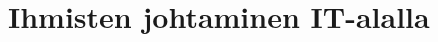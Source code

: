 \documentclass[a4paper]{article}
\begin{document}




\section{Ihmisten johtaminen IT-alalla}





\citep{grosjean2010}
\citep{appelo2012}
\citep{rsaanimate}
\citep{adkins2010}
\citep{augustine2005}
\citep{mcconnell1996}



\end{document}
